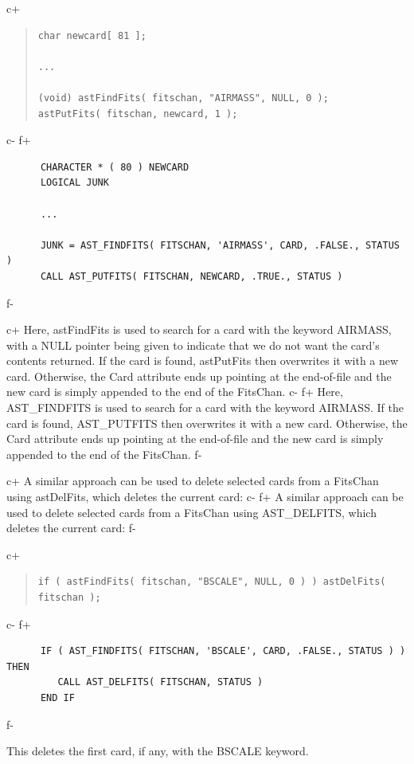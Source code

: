 \documentclass[twoside,11pt]{article}
\begin{document}
c+
\begin{quote}
\small
\begin{verbatim}
char newcard[ 81 ];

...

(void) astFindFits( fitschan, "AIRMASS", NULL, 0 );
astPutFits( fitschan, newcard, 1 );
\end{verbatim}
\normalsize
\end{quote}
c-
f+
\small
\begin{verbatim}
      CHARACTER * ( 80 ) NEWCARD
      LOGICAL JUNK

      ...

      JUNK = AST_FINDFITS( FITSCHAN, 'AIRMASS', CARD, .FALSE., STATUS )
      CALL AST_PUTFITS( FITSCHAN, NEWCARD, .TRUE., STATUS )
\end{verbatim}
\normalsize
f-

c+
Here, astFindFits is used to search for a card with the keyword
AIRMASS, with a NULL pointer being given to indicate that we do not
want the card's contents returned. If the card is found, astPutFits
then overwrites it with a new card.  Otherwise, the Card attribute
ends up pointing at the end-of-file and the new card is simply
appended to the end of the FitsChan.
c-
f+
Here, AST\_FINDFITS is used to search for a card with the keyword
AIRMASS. If the card is found, AST\_PUTFITS then overwrites it with a
new card.  Otherwise, the Card attribute ends up pointing at the
end-of-file and the new card is simply appended to the end of the
FitsChan.
f-

c+
A similar approach can be used to delete selected cards from a
FitsChan using astDelFits, which deletes the current card:
c-
f+
A similar approach can be used to delete selected cards from a
FitsChan using AST\_DELFITS, which deletes the current card:
f-

c+
\begin{quote}
\small
\begin{verbatim}
if ( astFindFits( fitschan, "BSCALE", NULL, 0 ) ) astDelFits( fitschan );
\end{verbatim}
\normalsize
\end{quote}
c-
f+
\small
\begin{verbatim}
      IF ( AST_FINDFITS( FITSCHAN, 'BSCALE', CARD, .FALSE., STATUS ) ) THEN
         CALL AST_DELFITS( FITSCHAN, STATUS )
      END IF
\end{verbatim}
\normalsize
f-

This deletes the first card, if any, with the BSCALE keyword.
\end{document}
